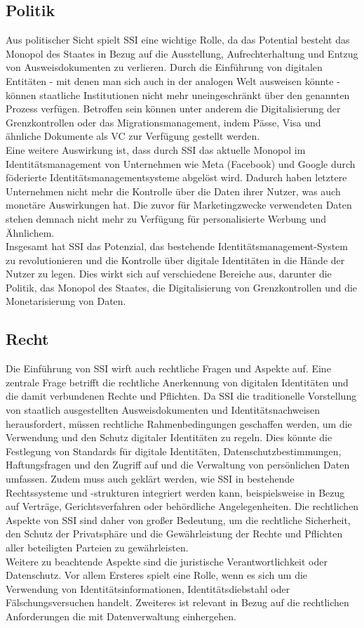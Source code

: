 \subsection{Politik}
Aus politischer Sicht spielt SSI eine wichtige Rolle, da das Potential besteht das Monopol des Staates in Bezug auf die Ausstellung, Aufrechterhaltung und Entzug von Ausweisdokumenten zu verlieren. Durch die Einführung von digitalen Entitäten - mit denen man sich auch in der analogen Welt ausweisen könnte - können staatliche Institutionen nicht mehr uneingeschränkt über den genannten Prozess verfügen. Betroffen sein können unter anderem die Digitalisierung der Grenzkontrollen oder das Migrationsmanagement, indem Pässe, Visa und ähnliche Dokumente als VC zur Verfügung gestellt werden. \\
Eine weitere Auswirkung ist, dass durch SSI das aktuelle Monopol im Identitätsmanagement von Unternehmen wie Meta (Facebook) und Google durch föderierte Identitätsmanagementsysteme abgelöst wird. Dadurch haben letztere Unternehmen nicht mehr die Kontrolle über die Daten ihrer Nutzer, was auch monetäre Auswirkungen hat. Die zuvor für Marketingzwecke verwendeten Daten stehen demnach nicht mehr zu Verfügung für personalisierte Werbung und Ähnlichem.\\
Insgesamt hat SSI das Potenzial, das bestehende Identitätsmanagement-System zu revolutionieren und die Kontrolle über digitale Identitäten in die Hände der Nutzer zu legen. Dies wirkt sich auf verschiedene Bereiche aus, darunter die Politik, das Monopol des Staates, die Digitalisierung von Grenzkontrollen und die Monetarisierung von Daten.

\subsection{Recht}
Die Einführung von SSI wirft auch rechtliche Fragen und Aspekte auf. Eine zentrale Frage betrifft die rechtliche Anerkennung von digitalen Identitäten und die damit verbundenen Rechte und Pflichten. Da SSI die traditionelle Vorstellung von staatlich ausgestellten Ausweisdokumenten und Identitätsnachweisen herausfordert, müssen rechtliche Rahmenbedingungen geschaffen werden, um die Verwendung und den Schutz digitaler Identitäten zu regeln. Dies könnte die Festlegung von Standards für digitale Identitäten, Datenschutzbestimmungen, Haftungsfragen und den Zugriff auf und die Verwaltung von persönlichen Daten umfassen. Zudem muss auch geklärt werden, wie SSI in bestehende Rechtssysteme und -strukturen integriert werden kann, beispielsweise in Bezug auf Verträge, Gerichtsverfahren oder behördliche Angelegenheiten. Die rechtlichen Aspekte von SSI sind daher von großer Bedeutung, um die rechtliche Sicherheit, den Schutz der Privatsphäre und die Gewährleistung der Rechte und Pflichten aller beteiligten Parteien zu gewährleisten.\\
Weitere zu beachtende Aspekte sind die juristische Verantwortlichkeit oder Datenschutz. Vor allem Ersteres spielt eine Rolle, wenn es sich um die Verwendung von Identitätsinformationen, Identitätsdiebstahl oder Fälschungsversuchen handelt. Zweiteres ist relevant in Bezug auf die rechtlichen Anforderungen die mit Datenverwaltung einhergehen.

